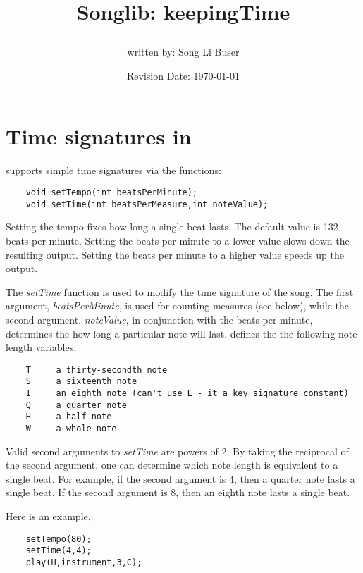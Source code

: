 \documentclass{article}
\title{Songlib: keepingTime\\
\date{Revision Date: \today}}
\author{written by: Song Li Buser}
\begin{document}
\maketitle

\W\subsubsection*{}
\W\htmlrule

\section*{Time signatures in \songlib}

\Songlib supports simple time signatures via the functions:

\begin{verbatim}
    void setTempo(int beatsPerMinute);
    void setTime(int beatsPerMeasure,int noteValue);
\end{verbatim}

Setting the tempo fixes how long a single beat lasts. The default
value is 132 beats per minute. Setting the beats per minute to a
lower value slows down the resulting output. Setting the beats
per minute to a higher value speeds up the output.

The {\it setTime} function is used to modify the time signature of
the song. The first argument,
{\it beatsPerMinute}, is used for counting measures (see below),
while the second argument, {\it noteValue}, in conjunction with
the beats per minute, determines the how long a particular note
will last. \Songlib defines the the
following note length variables:

\begin{verbatim}
    T     a thirty-secondth note
    S     a sixteenth note
    I     an eighth note (can't use E - it a key signature constant)
    Q     a quarter note
    H     a half note
    W     a whole note
\end{verbatim}

Valid second arguments to {\it setTime} are powers of 2. By taking
the reciprocal of
the second argument, one can determine which note length is equivalent
to a single beat. For example, if the second argument is 4,
then a quarter note lasts a single beat. If the second argument
is 8, then an eighth note lasts a single beat.

Here is an example,

\begin{verbatim}
    setTempo(80);
    setTime(4,4);
    play(H,instrument,3,C);
\end{verbatim}
\end{document}
